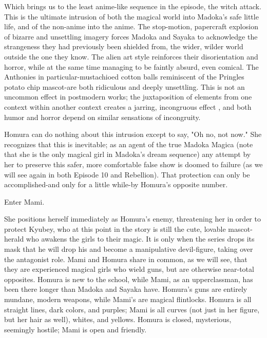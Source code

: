 Which brings us to the least anime-like sequence in the episode, the witch attack. This is the ultimate intrusion of both the magical world into Madoka's safe little life, and of the non-anime into the anime. The stop-motion, papercraft explosion of bizarre and unsettling imagery forces Madoka and Sayaka to acknowledge the strangeness they had previously been shielded from, the wider, wilder world outside the one they know. The alien art style reinforces their disorientation and horror, while at the same time managing to be faintly absurd, even comical. The Anthonies in particular-mustachioed cotton balls reminiscent of the Pringles potato chip mascot-are both ridiculous and deeply unsettling. This is not an uncommon effect in postmodern works; the juxtaposition of elements from one context within another context creates a jarring, incongruous effect \cite{ref21}, and both humor \cite{ref22} and horror \cite{ref23} depend on similar sensations of incongruity.

Homura can do nothing about this intrusion except to say, "Oh no, not now." She recognizes that this is inevitable; as an agent of the true Madoka Magica (note that she is the only magical girl in Madoka's dream sequence) any attempt by her to preserve this safer, more comfortable false show is doomed to failure (as we will see again in both Episode 10 and Rebellion). That protection can only be accomplished-and only for a little while-by Homura's opposite number.

Enter Mami. 

She positions herself immediately as Homura's enemy, threatening her in order to protect Kyubey, who at this point in the story is still the cute, lovable mascot-herald who awakens the girls to their magic. It is only when the series drops its mask that he will drop his and become a manipulative devil-figure, taking over the antagonist role. Mami and Homura share in common, as we will see, that they are experienced magical girls who wield guns, but are otherwise near-total opposites. Homura is new to the school, while Mami, as an upperclassman, has been there longer than Madoka and Sayaka have. Homura's guns are entirely mundane, modern weapons, while Mami's are magical flintlocks. Homura is all straight lines, dark colors, and purples; Mami is all curves (not just in her figure, but her hair as well), whites, and yellows. Homura is closed, mysterious, seemingly hostile; Mami is open and friendly.

